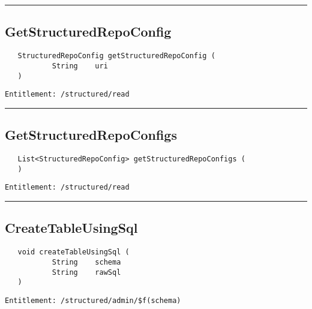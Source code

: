 \rule{12cm}{2pt}
\subsection{GetStructuredRepoConfig}
\label{Api:GetStructuredRepoConfig}
\begin{Verbatim}
   StructuredRepoConfig getStructuredRepoConfig (
           String    uri
   )
\end{Verbatim}
\begin{Verbatim}[formatcom=\color{Maroon}]
  Entitlement: /structured/read
\end{Verbatim}



\rule{12cm}{2pt}
\subsection{GetStructuredRepoConfigs}
\label{Api:GetStructuredRepoConfigs}
\begin{Verbatim}
   List<StructuredRepoConfig> getStructuredRepoConfigs (
   )
\end{Verbatim}
\begin{Verbatim}[formatcom=\color{Maroon}]
  Entitlement: /structured/read
\end{Verbatim}



\rule{12cm}{2pt}
\subsection{CreateTableUsingSql}
\label{Api:CreateTableUsingSql}
\begin{Verbatim}
   void createTableUsingSql (
           String    schema
           String    rawSql
   )
\end{Verbatim}
\begin{Verbatim}[formatcom=\color{Maroon}]
  Entitlement: /structured/admin/$f(schema)
\end{Verbatim}




